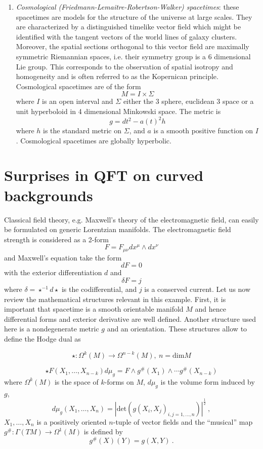 \documentclass[11pt]{article}
\newcommand{\1}{\mathds{1}}                         %
\begin{document}
\begin{enumerate}
\item \textit{Cosmological (Friedmann-Lemaitre-Robertson-Walker) spacetimes}: these spacetimes are models for the structure of the universe at large scales. They are characterized by a distinguished timelike vector field which might be identified with the tangent vectors of the world lines of galaxy clusters. Moreover, the spatial sections orthogonal to this vector field are maximally symmetric Riemannian spaces, 
i.e. their symmetry group is a 6 dimensional Lie group. This corresponds to the observation of spatial isotropy and homogeneity and is often referred to as the Kopernican principle. Cosmological spacetimes  are of the form
\[M=I\times \Sigma\]
where $I$ is an open interval and $\Sigma$ either the 3 sphere, euclidean 3 space or a unit hyperboloid in 4 dimensional Minkowski space. 
The metric is 
\[g=dt^2-a(t)^2h\]
where $h$ is the standard metric on $\Sigma$,
and $a$ is a smooth positive function on $I$.  Cosmological spacetimes are globally hyperbolic.
\end{enumerate}
\section{Surprises in QFT on curved backgrounds}
Classical field theory, e.g. Maxwell's theory of the electromagnetic field, can easily be formulated on generic Lorentzian manifolds. The electromagnetic field strength is considered as a 2-form
\[
F=F_{\mu\nu}dx^{\mu}\wedge dx^{\nu}
\]
and Maxwell's equation take the form
\[dF=0\]
with the exterior differentiation $d$ and
\[\delta F=j\]
where $\delta=\star^{-1}d\star$ is the codifferential, and $j$ is a conserved current. Let us now review the mathematical structures relevant in this example. First, it is important that spacetime is a smooth orientable manifold $M$ and hence differential forms and exterior derivative are well defined. Another structure used here is a nondegenerate metric $g$ and an orientation. These structures allow to define the Hodge dual as

\[\star:\Omega^k(M)\to\Omega^{n-k}(M),\ n=\mathrm{dim}M \]

\[\star F(X_1,\dots,X_{n-k})d\mu_g=F\wedge g^{\#}(X_1)\wedge\cdots g^{\#}(X_{n-k})\] where $\Omega^k(M)$ is the space of $k$-forms on $M$, $d\mu_g$ is the volume form induced by $g$,
\[d\mu_g(X_1,\dots,X_n)=|\mathrm{det}\left(g(X_i,X_j)_{i,j=1,\dots,n}\right)|^{\frac12}\ ,\]
 $X_1,\dots,X_{n}$ is a positively oriented $n$-tuple of vector fields and the ``musical'' map $g^{\#}:\Gamma(TM)\to \Omega^1(M)$   is defined by
\[g^{\#}(X)(Y)=g(X,Y) \ .\]
\end{document}
